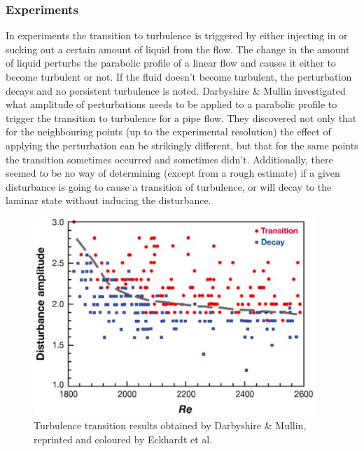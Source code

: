 \documentclass[11pt,a4paper]{article}
\begin{document}
\subsubsection{Experiments}
In experiments the transition to turbulence is triggered by either injecting in or sucking out a certain amount of liquid from the flow.
The change in the amount of liquid perturbs the parabolic profile of a linear flow and causes it either to become turbulent or not.
If the fluid doesn't become turbulent, the perturbation decays and no persistent turbulence is noted.
Darbyshire \& Mullin\cite{Darbyshire95} investigated what amplitude of perturbations needs to be applied to a parabolic profile to trigger the transition to turbulence for a pipe flow.
They discovered not only that for the neighbouring points (up to the experimental resolution) the effect of applying the perturbation can be strikingly different, but that for the same points the transition sometimes occurred and sometimes didn't.
Additionally, there seemed to be no way of determining (except from a rough estimate) if a given disturbance is going to cause a transition of turbulence, or will decay to the laminar state without inducing the disturbance.

\begin{figure}[h]
    \centering
    \includegraphics[width=0.95\textwidth]{darbyshire95.png}
    \caption{Turbulence transition results obtained by Darbyshire \& Mullin\cite{Darbyshire95}, reprinted and coloured by Eckhardt et al.\cite{Eckhardt07}}\label{img:darbyshire_plot}
\end{figure}
\end{document}
